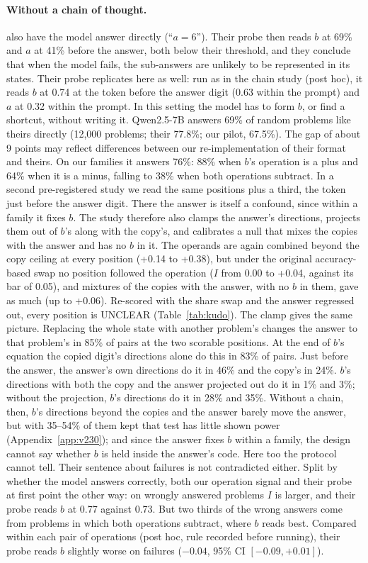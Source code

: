 \documentclass{article}
\begin{document}
\paragraph{Without a chain of thought.} \citet{kudo2026} also have the model answer directly (``$a = 6$''). Their probe then reads $b$ at 69\% and $a$ at 41\% before the answer, both below their threshold, and they conclude that when the model fails, the sub-answers are unlikely to be represented in its states. Their probe replicates here as well: run as in the chain study (post hoc), it reads $b$ at 0.74 at the token before the answer digit (0.63 within the prompt) and $a$ at 0.32 within the prompt. In this setting the model has to form $b$, or find a shortcut, without writing it. Qwen2.5-7B answers 69\% of random problems like theirs directly (12,000 problems; their 77.8\%; our pilot, 67.5\%). The gap of about 9 points may reflect differences between our re-implementation of their format and theirs. On our families it answers 76\%: 88\% when $b$'s operation is a plus and 64\% when it is a minus, falling to 38\% when both operations subtract. In a second pre-registered study we read the same positions plus a third, the token just before the answer digit. There the answer is itself a confound, since within a family it fixes $b$. The study therefore also clamps the answer's directions, projects them out of $b$'s along with the copy's, and calibrates a null that mixes the copies with the answer and has no $b$ in it. The operands are again combined beyond the copy ceiling at every position (+0.14 to +0.38), but under the original accuracy-based swap no position followed the operation ($I$ from 0.00 to +0.04, against its bar of 0.05), and mixtures of the copies with the answer, with no $b$ in them, gave as much (up to +0.06). Re-scored with the share swap and the answer regressed out, every position is UNCLEAR (Table~\ref{tab:kudo}). The clamp gives the same picture. Replacing the whole state with another problem's changes the answer to that problem's in 85\% of pairs at the two scorable positions. At the end of $b$'s equation the copied digit's directions alone do this in 83\% of pairs. Just before the answer, the answer's own directions do it in 46\% and the copy's in 24\%. $b$'s directions with both the copy and the answer projected out do it in 1\% and 3\%; without the projection, $b$'s directions do it in 28\% and 35\%. Without a chain, then, $b$'s directions beyond the copies and the answer barely move the answer, but with 35--54\% of them kept that test has little shown power (Appendix~\ref{app:v230}); and since the answer fixes $b$ within a family, the design cannot say whether $b$ is held inside the answer's code. Here too the protocol cannot tell. Their sentence about failures is not contradicted either. Split by whether the model answers correctly, both our operation signal and their probe at first point the other way: on wrongly answered problems $I$ is larger, and their probe reads $b$ at 0.77 against 0.73. But two thirds of the wrong answers come from problems in which both operations subtract, where $b$ reads best. Compared within each pair of operations (post hoc, rule recorded before running), their probe reads $b$ slightly worse on failures ($-0.04$, 95\% CI $[-0.09, +0.01]$).
\end{document}
